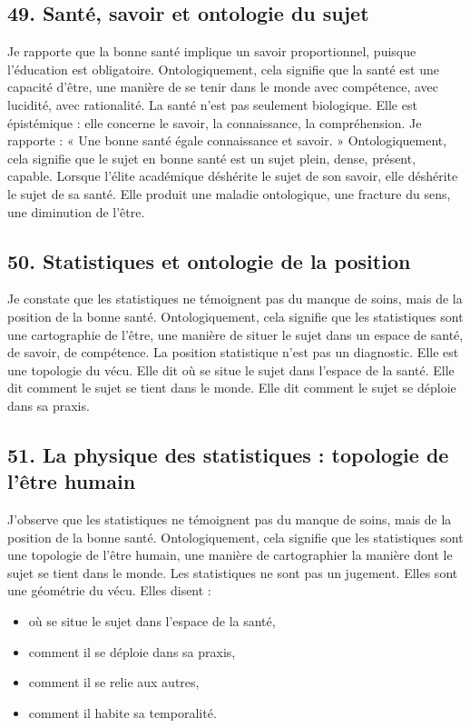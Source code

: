 \documentclass[12pt,letterpaper,oneside]{article}
\begin{document}
\subsection*{49. Santé, savoir et ontologie du sujet}
Je rapporte que la bonne santé implique un savoir proportionnel, puisque l’éducation est obligatoire. Ontologiquement, cela signifie que la santé est une capacité d’être, une manière de se tenir dans le monde avec compétence, avec lucidité, avec rationalité.
La santé n’est pas seulement biologique. Elle est épistémique : elle concerne le savoir, la connaissance, la compréhension.
Je rapporte :
« Une bonne santé égale connaissance et savoir. »
Ontologiquement, cela signifie que le sujet en bonne santé est un sujet plein, dense, présent, capable.
Lorsque l’élite académique déshérite le sujet de son savoir, elle déshérite le sujet de sa santé. Elle produit une maladie ontologique, une fracture du sens, une diminution de l’être.

\subsection*{50. Statistiques et ontologie de la position}
Je constate que les statistiques ne témoignent pas du manque de soins, mais de la position de la bonne santé. Ontologiquement, cela signifie que les statistiques sont une cartographie de l’être, une manière de situer le sujet dans un espace de santé, de savoir, de compétence.
La position statistique n’est pas un diagnostic. Elle est une topologie du vécu.
Elle dit où se situe le sujet dans l’espace de la santé. Elle dit comment le sujet se tient dans le monde. Elle dit comment le sujet se déploie dans sa praxis.

\subsection*{51. La physique des statistiques : topologie de l’être humain}
J’observe que les statistiques ne témoignent pas du manque de soins, mais de la position de la bonne santé. Ontologiquement, cela signifie que les statistiques sont une topologie de l’être humain, une manière de cartographier la manière dont le sujet se tient dans le monde.
Les statistiques ne sont pas un jugement. Elles sont une géométrie du vécu.
Elles disent :
\begin{itemize}
\item où se situe le sujet dans l’espace de la santé,
\item comment il se déploie dans sa praxis,
\item comment il se relie aux autres,
\item comment il habite sa temporalité.
\end{itemize}
\end{document}
